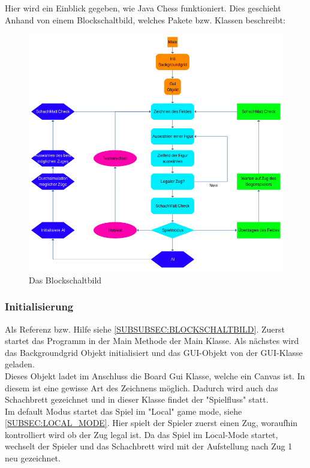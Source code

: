 \documentclass[12pt,a4paper]{article}
\newcommand{\cmnt}[1]{}			%
\begin{document}
{Hier wird ein Einblick gegeben, wie Java Chess funktioniert. Dies geschieht Anhand von einem Blockschaltbild, welches Pakete bzw. Klassen beschreibt: 
\begin{figure}
  \centering
   	\includegraphics[width=12cm]{graphics/block.png}
  \caption{Das Blockschaltbild}
  \label{fig:block}
\end{figure}

\cmnt{Blockschaltbild verändern, da init Backgroundgrid und GUI-Objekt vertauscht sind.}

\subsubsection{Initialisierung}
\label{SUBSUBSEC:INIT}

\cmnt{Hier soll erklärt werden wie JavaChess initialisiert wird.}

Als Referenz bzw. Hilfe siehe \ref{SUBSUBSEC:BLOCKSCHALTBILD}.
Zuerst startet das Programm in der Main Methode der Main Klasse. Als nächstes wird das Backgroundgrid Objekt initialisiert und das GUI-Objekt von der GUI-Klasse geladen. \\
Dieses Objekt ladet im Anschluss die Board Gui Klasse, welche ein Canvas ist. In diesem ist eine gewisse Art des Zeichnens möglich. Dadurch wird auch das Schachbrett gezeichnet und in dieser Klasse findet der "Spielfluss" statt. \\ 
Im default Modus startet das Spiel im "Local" game mode, siehe \ref{SUBSEC:LOCAL_MODE}. Hier spielt der Spieler zuerst einen Zug, woraufhin kontrolliert wird ob der Zug legal ist. Da das Spiel im Local-Mode startet, wechselt der Spieler und das Schachbrett wird mit der Aufstellung nach Zug 1 neu gezeichnet.

}
\end{document}
